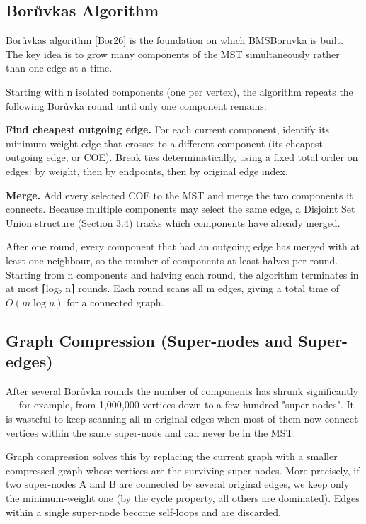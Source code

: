 \documentclass[11pt]{article}
\theoremstyle{plain}
\theoremstyle{remark}
\begin{document}
\subsection{Borůvka\textquotesingle s Algorithm}

Borůvka\textquotesingle s algorithm {[}Bor26{]} is the foundation on
which BMSBoruvka is built. The key idea is to grow many components of
the MST simultaneously rather than one edge at a time.

Starting with n isolated components (one per vertex), the algorithm
repeats the following Borůvka round until only one component remains:

\textbf{Find cheapest outgoing edge.} For each current component,
identify its minimum-weight edge that crosses to a different component
(its cheapest outgoing edge, or COE). Break ties deterministically,
using a fixed total order on edges: by weight, then by endpoints, then
by original edge index.

\textbf{Merge.} Add every selected COE to the MST and merge the two
components it connects. Because multiple components may select the same
edge, a Disjoint Set Union structure (Section 3.4) tracks which
components have already merged.

After one round, every component that had an outgoing edge has merged
with at least one neighbour, so the number of components at least halves
per round. Starting from n components and halving each round, the
algorithm terminates in at most ⌈log₂ n⌉ rounds. Each round scans all m
edges, giving a total time of \(O(m \log n)\) for a connected graph.

\subsection{Graph Compression (Super-nodes and Super-edges)}

After several Borůvka rounds the number of components has shrunk
significantly --- for example, from 1,000,000 vertices down to a few
hundred "super-nodes". It is wasteful to keep scanning all m original
edges when most of them now connect vertices within the same super-node
and can never be in the MST.

Graph compression solves this by replacing the current graph with a
smaller compressed graph whose vertices are the surviving super-nodes.
More precisely, if two super-nodes A and B are connected by several
original edges, we keep only the minimum-weight one (by the cycle
property, all others are dominated). Edges within a single super-node
become self-loops and are discarded.
\end{document}

